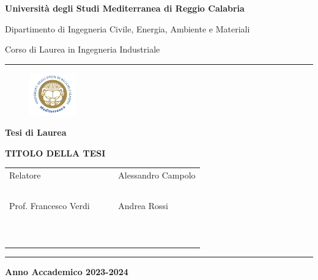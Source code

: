 \documentclass[envcountsame,envcountchap]{svmono}
\date{}
\begin{document}


\setcounter{page}{5}

\frontmatter

\begin{titlepage}

    \begin{center}

    \large{\bf Università degli Studi Mediterranea di Reggio Calabria}

    \vspace*{1mm}

    \large{Dipartimento di Ingegneria Civile, Energia, Ambiente e Materiali}

    \vspace*{1mm}

    \normalsize{Corso di Laurea in Ingegneria Industriale}

    \vspace*{1mm}


    \hspace*{-0mm}

    \rule{125mm}{.2mm}  %


    \vspace{18mm}

    \begin{figure}[h!]
    \centerline{\includegraphics[width=2cm]{logounirc.png}}
    \end{figure}

    \vspace{5mm}

    \textbf{Tesi di Laurea}

    \vspace{5mm}

    \large{\bf TITOLO DELLA TESI }

    \vspace{22mm}

    \begin{tabular}{lcl}
    {\large Relatore} & \ \hskip 4cm \ & {\large Alessandro Campolo} \\
    \ & \ & \ \\
    {Prof. Francesco Verdi} &    & {Andrea Rossi}\\
    \ & \ & \ \\
    \ & \ & \ \\
    \\
    \end{tabular}

    \rule{125mm}{.2mm}

    \textbf{Anno Accademico 2023-2024}
    \end{center}

\end{titlepage}
\end{document}
